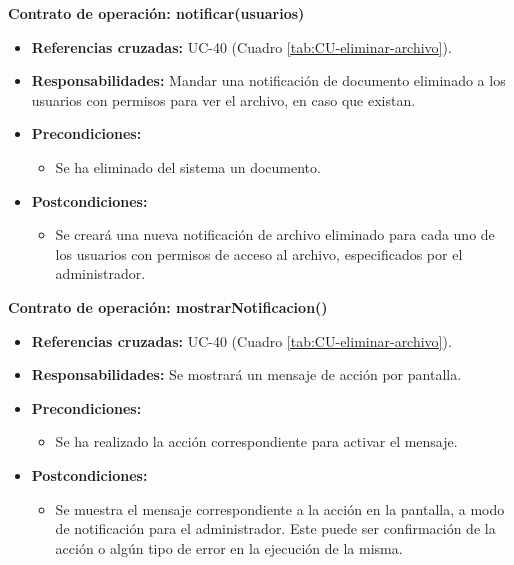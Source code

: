 \textbf{Contrato de operación: notificar(usuarios)}
\begin{itemize}
\item \textbf{Referencias cruzadas:} UC-40 (Cuadro \ref{tab:CU-eliminar-archivo}).
\item \textbf{Responsabilidades:} Mandar una notificación de documento eliminado a los usuarios con permisos para ver el archivo, en caso que existan.
\item \textbf{Precondiciones:} 
 \begin{itemize}
\item Se ha eliminado del sistema un documento.
\end {itemize}
\item \textbf{Postcondiciones:} 
 \begin{itemize}
\item Se creará una nueva notificación de archivo eliminado para cada uno de los usuarios con permisos de acceso al archivo, especificados por el administrador.
\end {itemize}
\end {itemize}

\textbf{Contrato de operación: mostrarNotificacion()}
\begin{itemize}
\item \textbf{Referencias cruzadas:} UC-40 (Cuadro \ref{tab:CU-eliminar-archivo}).
\item \textbf{Responsabilidades:} Se mostrará un mensaje de acción por pantalla.
\item \textbf{Precondiciones:} 
 \begin{itemize}
\item Se ha realizado la acción correspondiente para activar el mensaje.
\end {itemize}
\item \textbf{Postcondiciones:} 
 \begin{itemize}
\item Se muestra el mensaje correspondiente a la acción en la pantalla, a modo de notificación para el administrador. Este puede ser confirmación de la acción o algún tipo de error en la ejecución de la misma.
\end {itemize}
\end {itemize}


